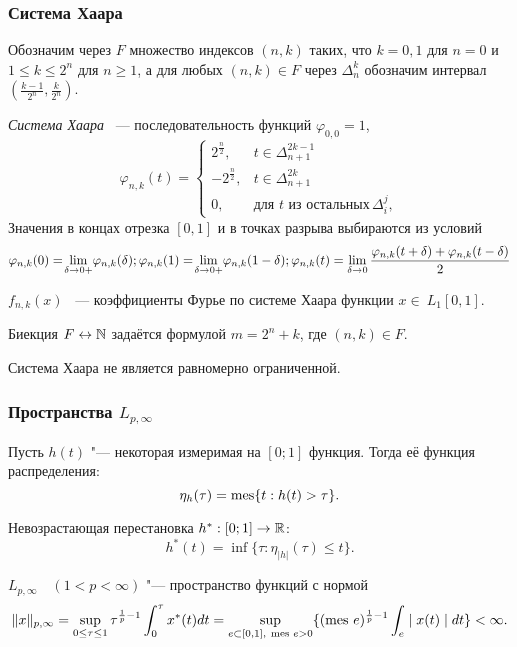 \begin{frame}\frametitle{Система Хаара}


Обозначим через $F$ множество индексов $(n,k)$ таких, что
$k=0,1$ для $n=0$ и $1\leq k \leq 2^n$ для $n\geq 1$, а для любых
$(n,k)\in F$ через $\Delta_n^k$ обозначим интервал $
(\frac{k-1}{2^n},\frac{k}{2^n})$.

\emph{Система Хаара} ~--- последовательность функций $\varphi_{0,0}=1$,
$$\varphi_{n,k} (t)=\begin{cases} 2^\frac{n}2, &t\in \Delta_{n+1}^{2k-1}\\
-2^\frac{n}2, &t\in \Delta_{n+1}^{2k}\\0,  &\text{для} \,\, t \,\,
\text{из остальных} \, \Delta_i^j,
\end{cases}$$
Значения в концах отрезка $[0,1]$ и в
точках разрыва выбираются из условий
\begin{equation}
	\varphi_{n,k} (0)= \!\lim_{\delta \to 0+}\!\varphi_{n,k}
	(\delta);
	\hfill
	\varphi_{n,k} (1)= \!\lim_{\delta \to
	0+}\!\varphi_{n,k} (1-\delta);
	\hfill
	\varphi_{n,k} (t)= \lim_{\delta \to 0}\frac{\varphi_{n,k}
	(t+\delta)+\varphi_{n,k} (t-\delta)}2
\end{equation}


$f_{n,k}(x)$ ~--- коэффициенты Фурье по
системе Хаара функции $x\in~L_1 [0,1]$.

Биекция $F \leftrightarrow \mathbb{N}$ задаётся формулой
$m=2^n+k$, где
$(n,k)\in F$.

\vfill

Система Хаара не является равномерно ограниченной.

\end{frame}

\begin{frame}\frametitle{Пространства $L_{p,\infty}$}

	Пусть $h(t)$ "--- некоторая измеримая на $[0;1]$ функция.
	Тогда её функция распределения:
	\begin{equation}
		\eta_h(\tau) = \operatorname{mes} \{t : h(t) > \tau \}
		.
	\end{equation}

	Невозрастающая перестановка $h^* : [0;1] \to \mathbb{R}$:
	\begin{equation}
		h^*(t) = \inf\{\tau: \eta_{|h|}(\tau) \leq t \}.
	\end{equation}


	$L_{p,\infty}\quad(1<p<\infty)$ "--- пространство
	функций с нормой
	\begin{equation}
		\| x \|_{p,\infty}=\sup\limits_{0\leq \tau \leq
		1} \tau^{\frac{1}{p}-1}\int_0^\tau  x^*(t)dt =
		\sup_{e\subset[0,1], \ \operatorname{mes}\, e > 0}
		\{(\operatorname{mes}\, e)^{\frac{1}{p}-1}\int_e \mid x(t)\mid dt\}<\infty
		.
	\end{equation}


\end{frame}


